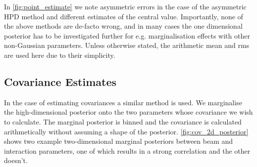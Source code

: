 In \autoref{fig:point_estimate} we note asymmetric errors in the case of the asymmetric HPD method and different estimates of the central value. Importantly, none of the above methods are de-facto wrong, and in many cases the one dimensional posterior has to be investigated further for e.g. marginalisation effects with other non-Gaussian parameters. Unless otherwise stated, the arithmetic mean and rms are used here due to their simplicity.

\subsection{Covariance Estimates}
In the case of estimating covariances a similar method is used. We marginalise the high-dimensional posterior onto the two parameters whose covariance we wish to calculate. The marginal posterior is binned and the covariance is calculated arithmetically without assuming a shape of the posterior. \autoref{fig:cov_2d_posterior} shows two example two-dimensional marginal posteriors between beam and interaction parameters, one of which results in a strong correlation and the other doesn't.

